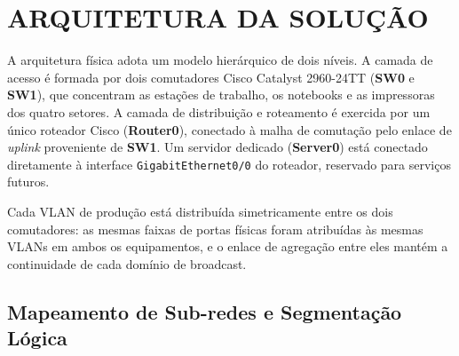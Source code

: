 \section{ARQUITETURA DA SOLUÇÃO}

A arquitetura física adota um modelo hierárquico de dois níveis. A camada de acesso é
formada por dois comutadores Cisco Catalyst 2960-24TT (\textbf{SW0} e \textbf{SW1}),
que concentram as estações de trabalho, os notebooks e as impressoras dos quatro
setores. A camada de distribuição e roteamento é exercida por um único roteador Cisco
(\textbf{Router0}), conectado à malha de comutação pelo enlace de \textit{uplink}
proveniente de \textbf{SW1}. Um servidor dedicado (\textbf{Server0}) está conectado
diretamente à interface \texttt{GigabitEthernet0/0} do roteador, reservado para
serviços futuros.

Cada VLAN de produção está distribuída simetricamente entre os dois comutadores: as
mesmas faixas de portas físicas foram atribuídas às mesmas VLANs em ambos os
equipamentos, e o enlace de agregação entre eles mantém a continuidade de cada domínio
de broadcast.

\subsection{Mapeamento de Sub-redes e Segmentação Lógica}

